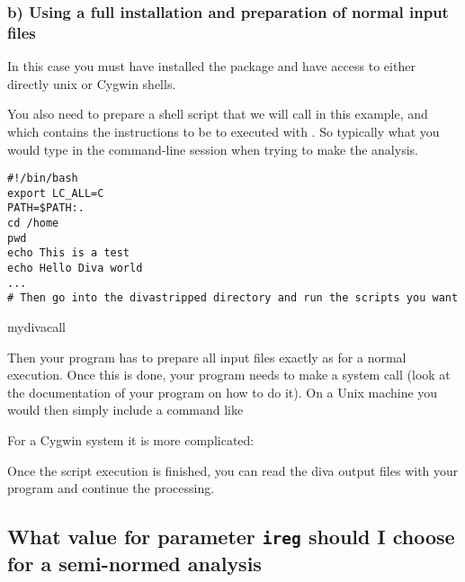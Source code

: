 \subsubsection{b) Using a full \diva installation and preparation of normal \diva input files}

In this case you must have installed the \diva package and have access to either directly unix or Cygwin shells.

You also need to prepare a shell script that we will call  in this example, and which contains the instructions to be to executed with \diva. So typically what you would type in the command-line session when trying to make the analysis.

\begin{exfile}[htpb]
\begin{footnotesize}
\begin{verbatim}
#!/bin/bash
export LC_ALL=C
PATH=$PATH:.
cd /home
pwd
echo This is a test
echo Hello Diva world
...
# Then go into the divastripped directory and run the scripts you want
\end{verbatim}
\end{footnotesize}
\caption{mydivacall\label{ex:mydivacall}}
\end{exfile}

Then your program has to prepare all input files exactly as for a normal \diva execution. Once this is done, your program needs to make a system call (look at the documentation of your program on how to do it). On a Unix machine you would then simply include a command like


For a Cygwin system it is more complicated:

{\footnotesize
{}
}

Once the script execution is finished, you can read the diva output files with your program and continue the processing.


\subsection{What value for parameter \texttt{ireg} should I choose for a semi-normed analysis}

